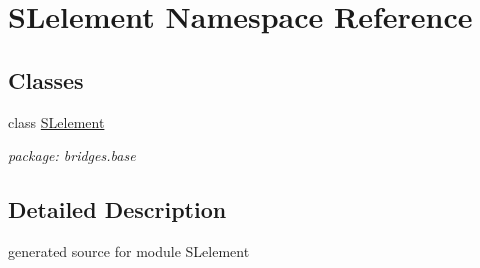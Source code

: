\hypertarget{namespace_s_lelement}{}\section{S\+Lelement Namespace Reference}
\label{namespace_s_lelement}
\subsection*{Classes}
\begin{DoxyCompactItemize}
\item 
class \hyperlink{class_s_lelement_1_1_s_lelement}{S\+Lelement}
\begin{DoxyCompactList}\small\item\em package\+: bridges.\+base \end{DoxyCompactList}\end{DoxyCompactItemize}


\subsection{Detailed Description}
\begin{DoxyVerb}generated source for module SLelement \end{DoxyVerb}
 